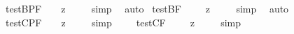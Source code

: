\begin{isabellebody}
\isamarkupfalse%
\ test{\isacharunderscore}B{\isacharunderscore}PF{\isacharcolon}\ {\isachardoublequoteopen}{\isacharbrackleft}{\isasymdiamond}\ {\isacharparenleft}{\isasymbox}\ {\isacharcomma}{\isasymphi}{\isacharcomma}{\isacharparenright}\ {\isasymrightarrow}\isactrlsup z\ {\isasymdiamond}\ {\isacharcomma}{\isasymphi}{\isacharcomma}{\isacharbrackright}{\isachardoublequoteclose}%
\isadelimproof
\ %
\endisadelimproof
%
\isatagproof
{}\isamarkupfalse%
\ simp\ \isamarkupfalse%
\ auto%
\endisatagproof
{\isafoldproof}%
%
\isadelimproof
%
\endisadelimproof
\isanewline
{}\isamarkupfalse%
\ test{\isacharunderscore}B{\isacharunderscore}F{\isacharcolon}\ \ {\isachardoublequoteopen}{\isacharbrackleft}{\isasymdiamond}\ {\isacharparenleft}{\isasymbox}\ {\isacharsemicolon}{\isasymphi}{\isacharsemicolon}{\isacharparenright}\ {\isasymrightarrow}\isactrlsup z\ {\isasymdiamond}\ {\isacharsemicolon}{\isasymphi}{\isacharsemicolon}{\isacharbrackright}{\isachardoublequoteclose}%
\isadelimproof
\ %
\endisadelimproof
%
\isatagproof
{}\isamarkupfalse%
\ simp\ \isamarkupfalse%
\ auto%
\endisatagproof
{\isafoldproof}%
%
\isadelimproof
%
\endisadelimproof
\isanewline
\isanewline
{}\isamarkupfalse%
\ test{\isacharunderscore}C{\isacharunderscore}PF{\isacharcolon}\ {\isachardoublequoteopen}{\isacharbrackleft}{\isasymbox}\ {\isacharparenleft}{\isasymdiamond}\ {\isacharcomma}{\isasymphi}{\isacharcomma}{\isacharparenright}\ {\isasymrightarrow}\isactrlsup z\ {\isasymbox}\ {\isacharcomma}{\isasymphi}{\isacharcomma}{\isacharbrackright}{\isachardoublequoteclose}%
\isadelimproof
\ %
\endisadelimproof
%
\isatagproof
{}\isamarkupfalse%
\ simp%
\endisatagproof
{\isafoldproof}%
%
\isadelimproof
%
\endisadelimproof
\ \isamarkupfalse%
%
\isadelimproof
\ %
\endisadelimproof
%
\isatagproof
{}\isamarkupfalse%
%
\endisatagproof
{\isafoldproof}%
%
\isadelimproof
%
\endisadelimproof
\isanewline
{}\isamarkupfalse%
\ test{\isacharunderscore}C{\isacharunderscore}F{\isacharcolon}\ \ {\isachardoublequoteopen}{\isacharbrackleft}{\isasymbox}\ {\isacharparenleft}{\isasymdiamond}\ {\isacharsemicolon}{\isasymphi}{\isacharsemicolon}{\isacharparenright}\ {\isasymrightarrow}\isactrlsup z\ {\isasymbox}\ {\isacharsemicolon}{\isasymphi}{\isacharsemicolon}{\isacharbrackright}{\isachardoublequoteclose}%
\isadelimproof
\ %
\endisadelimproof
%
\isatagproof
{}\isamarkupfalse%
\ simp%
\endisatagproof
{\isafoldproof}%
%
\isadelimproof

\end{isabellebody}
